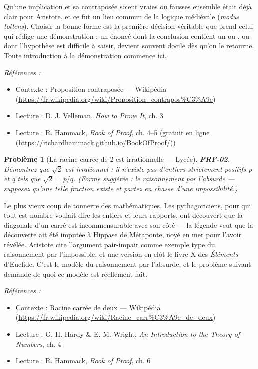 \documentclass[11pt]{article}
\newtheorem{problem}{Problème}
\newenvironment{refs}{\par\small\noindent\emph{Références :}\begin{itemize}\setlength\itemsep{0pt}}{\end{itemize}\normalsize}
\begin{document}
\noindent Qu'une implication et sa contraposée soient vraies ou fausses ensemble
était déjà clair pour Aristote, et ce fut un lieu commun de la logique médiévale
(\textit{modus tollens}). Choisir la bonne forme est la première décision véritable que prend
celui qui rédige une démonstration : un énoncé dont la conclusion contient un \og{} ou \fg{}, ou
dont l'hypothèse est difficile à saisir, devient souvent docile dès qu'on le retourne.
Toute introduction à la démonstration commence ici.

\begin{refs}
\item Contexte : Proposition contraposée --- Wikipédia (\url{https://fr.wikipedia.org/wiki/Proposition_contrapos%C3%A9e})
\item Lecture : D. J. Velleman, \textit{How to Prove It}, ch. 3
\item Lecture : R. Hammack, \textit{Book of Proof}, ch. 4--5 (gratuit en ligne (\url{https://richardhammack.github.io/BookOfProof/}))
\end{refs}

\bigskip

\begin{problem}[{La racine carrée de 2 est irrationnelle --- Lycée}]
\textbf{PRF-02.} Démontrez que $ \sqrt{2} $ est irrationnel : il
n'existe pas d'entiers strictement positifs p et q tels que $ \sqrt{2} = p/q $. (Forme
suggérée : le raisonnement par l'absurde --- supposez qu'une telle fraction existe et partez
en chasse d'une impossibilité.)
\end{problem}

\noindent Le plus vieux coup de tonnerre des mathématiques. Les pythagoriciens, pour
qui \og{} tout est nombre \fg{} voulait dire les entiers et leurs rapports, ont découvert que la
diagonale d'un carré est incommensurable avec son côté --- la légende veut que la découverte
ait été imputée à Hippase de Métaponte, noyé en mer pour l'avoir révélée. Aristote cite
l'argument pair-impair comme exemple type du raisonnement par l'impossible, et une version
en clôt le livre X des \textit{Éléments} d'Euclide. C'est le modèle du raisonnement par
l'absurde, et le problème suivant demande de quoi ce modèle est réellement fait.

\begin{refs}
\item Contexte : Racine carrée de deux --- Wikipédia (\url{https://fr.wikipedia.org/wiki/Racine_carr%C3%A9e_de_deux})
\item Lecture : G. H. Hardy \& E. M. Wright, \textit{An Introduction to the Theory of Numbers}, ch. 4
\item Lecture : R. Hammack, \textit{Book of Proof}, ch. 6
\end{refs}
\end{document}
